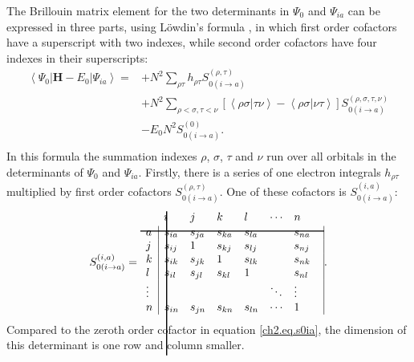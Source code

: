 The Brillouin matrix element for the two determinants in $\Psi_0$ and $\Psi_{ia}$ can be expressed in three parts, using L\"{o}wdin's formula \cite{lowdin}, in which first order cofactors have a superscript with two indexes, while second order cofactors have four indexes in their superscripts:
\begin{equation}
\begin{split}
\left < \Psi_0 | \mathbf{H} - E_0 | \Psi_{ia} \right>= & + N^2 \sum_{\rho\tau} h_{\rho\tau} S_{0(i\rightarrow a)}^{(\rho,\tau)} \\
& + N^2 \sum_{\rho<\sigma,\tau<\nu} [\left <\rho\sigma|\tau\nu \right > - \left < \rho\sigma | \nu\tau \right> ]  S_{0(i\rightarrow a)}^{(\rho,\sigma,\tau,\nu)} \\
&  - E_0 N^2 S_{0(i\rightarrow a)}^{(0)}.\\
\end{split}
\label{ch2.eq.lowdin}
\end{equation}
In this formula the summation indexes $\rho$, $\sigma$, $\tau$ and $\nu$ run over all orbitals in the determinants of $\Psi_0$ and $\Psi_{ia}$. Firstly, there is a series of one electron integrals $h_{\rho\tau}$ multiplied by first order cofactors $S_{0(i\rightarrow a)}^{(\rho,\tau)}$. One of these cofactors is $S_{0(i\rightarrow a)}^{(i,a)}$:
\begin{equation}
S_{0(i\rightarrow a)}^{(i,a)} =
\begin{array}{lllllll}
 &  \hskip 2.0 pt \hbox{\lower 120pt\hbox{\vrule height128pt width 1.0pt}}\hskip-3.0pt i & j & k & l & \cdots & n \\
\noalign{\vskip-115pt}
 a &  \multicolumn{1}{|l}{s_{ia}} & s_{ja}  & s_{ka} & s_{la} & & \multicolumn{1}{l|}{ s_{na} } \\
\noalign{\vskip-8pt}
\multispan7\hbox{\vrule  height 1.0 pt width164pt}\cr
\noalign{\vskip 7pt}
  j & \multicolumn{1}{|l}{s_{ij}} & 1 & s_{kj} & s_{lj} & & \multicolumn{1}{l|}{s_{nj}} \\
 k & \multicolumn{1}{|l}{s_{ik}} & s_{jk} & 1 & s_{lk} & & \multicolumn{1}{l|}{s_{nk}} \\
 l & \multicolumn{1}{|l}{s_{il}} & s_{jl} & s_{kl} & 1 & & \multicolumn{1}{l|}{s_{nl}} \\
 \vdots & \multicolumn{1}{|l}{ } &   &   & & \ddots & \multicolumn{1}{l|}{\vdots} \\
 n & \multicolumn{1}{|l}{ s_{in}} & s_{jn} & s_{kn} & s_{ln} & \cdots & \multicolumn{1}{l|}{1}
\end{array}.\\
\label{ch2.eq.examfoco}
\end{equation}
Compared to the zeroth order cofactor in equation \ref{ch2.eq.s0ia}, the dimension of this determinant is one row and column smaller. 

